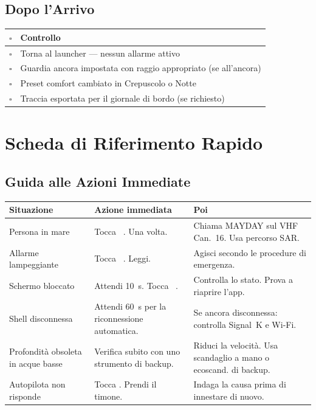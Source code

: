 \section*{Dopo l'Arrivo}

\begin{longtable}{C{0.8cm}L{12.9cm}}
\toprule
{}
\color{white}\sffamily\bfseries $\square$ &
\color{white}\sffamily\bfseries Controllo \\
\midrule
$\square$ & Torna al launcher --- nessun allarme attivo \\
$\square$ & Guardia ancora impostata con raggio appropriato (se all'ancora) \\
$\square$ & Preset comfort cambiato in Crepuscolo o Notte \\
$\square$ & Traccia esportata per il giornale di bordo (se richiesto) \\
\bottomrule
\end{longtable}

\chapter{Scheda di Riferimento Rapido}
\label{ch:riferimento-rapido}

\section*{Guida alle Azioni Immediate}

\begin{longtable}{L{3.6cm}L{4.4cm}L{5.7cm}}
\toprule
{}
\color{white}\sffamily\bfseries Situazione &
\color{white}\sffamily\bfseries Azione immediata &
\color{white}\sffamily\bfseries Poi \\
\midrule
Persona in mare &
  Tocca ~. Una volta. &
  Chiama MAYDAY sul VHF Can.~16. Usa percorso SAR. \\
Allarme lampeggiante &
  Tocca ~. Leggi. &
  Agisci secondo le procedure di emergenza. \\
Schermo bloccato &
  Attendi 10~s. Tocca ~. &
  Controlla lo stato. Prova a riaprire l'app. \\
Shell disconnessa &
  Attendi 60~s per la riconnessione automatica. &
  Se ancora disconnessa: controlla Signal~K e Wi-Fi. \\
Profondità obsoleta in acque basse &
  Verifica subito con uno strumento di backup. &
  Riduci la velocità. Usa scandaglio a mano o ecoscand. di backup. \\
Autopilota non risponde &
  Tocca . Prendi il timone. &
  Indaga la causa prima di innestare di nuovo. \\
\bottomrule
\end{longtable}

